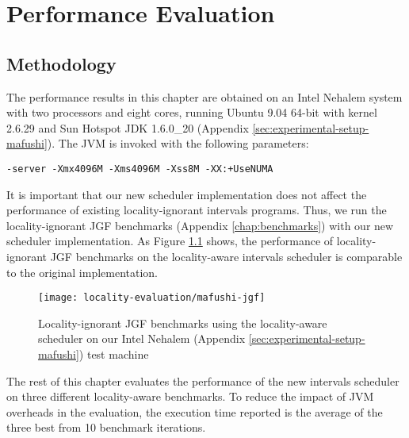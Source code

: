 
\chapter{Performance Evaluation}
\label{chap:locality-performance}

\section{Methodology}
\label{sec:locality-performance-methodology}


The performance results in this chapter are obtained on an Intel
Nehalem system with two processors and eight cores, running Ubuntu
9.04 64-bit with kernel 2.6.29 and Sun Hotspot JDK 1.6.0\_20 (Appendix
\ref{sec:experimental-setup-mafushi}). The JVM is invoked with the
following parameters:

\begin{lstlisting}[style=Listing]
  -server -Xmx4096M -Xms4096M -Xss8M -XX:+UseNUMA
\end{lstlisting}

It is important that our new scheduler implementation does not affect
the performance of existing locality-ignorant intervals
programs. Thus, we run the locality-ignorant JGF benchmarks (Appendix
\ref{chap:benchmarks}) with our new scheduler implementation. As
Figure \ref{fig:locality-evaluation-jgf} shows, the performance of
locality-ignorant JGF benchmarks on the locality-aware intervals
scheduler is comparable to the original implementation.

\begin{figure}[!ht]
  \centering
  \texttt{[image: locality-evaluation/mafushi-jgf]}
  \caption[Locality-ignorant JGF benchmarks running on locality-aware
  scheduler]{Locality-ignorant JGF benchmarks using the locality-aware
    scheduler on our Intel Nehalem (Appendix
    \ref{sec:experimental-setup-mafushi}) test machine}
  \label{fig:locality-evaluation-jgf}
\end{figure}

The rest of this chapter evaluates the performance of the new
intervals scheduler on three different locality-aware benchmarks. To
reduce the impact of JVM overheads in the evaluation, the execution
time reported is the average of the three best from 10 benchmark
iterations.

